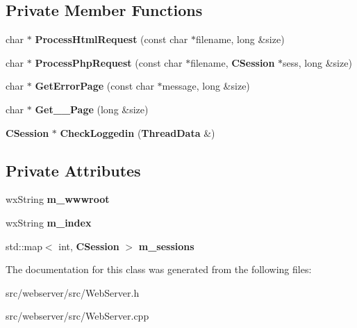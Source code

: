 \subsection*{Private Member Functions}
\begin{DoxyCompactItemize}
\item 
char $\ast$ {\bfseries ProcessHtmlRequest} (const char $\ast$filename, long \&size)\label{classCScriptWebServer_aca95abd93ae76d9c05e647e16886c0fb}

\item 
char $\ast$ {\bfseries ProcessPhpRequest} (const char $\ast$filename, {\bf CSession} $\ast$sess, long \&size)\label{classCScriptWebServer_a1b96b9caa1d2e296c8d6edcaacdf1869}

\item 
char $\ast$ {\bfseries GetErrorPage} (const char $\ast$message, long \&size)\label{classCScriptWebServer_a402a64475860a63434695e8941f8bd03}

\item 
char $\ast$ {\bfseries Get\_\_\-Page} (long \&size)\label{classCScriptWebServer_aeee089dee60950ab3a2959d228c513de}

\item 
{\bf CSession} $\ast$ {\bfseries CheckLoggedin} ({\bf ThreadData} \&)\label{classCScriptWebServer_abdf21bb79cecd59fdc5b297ab3b3c852}

\end{DoxyCompactItemize}
\subsection*{Private Attributes}
\begin{DoxyCompactItemize}
\item 
wxString {\bfseries m\_\-wwwroot}\label{classCScriptWebServer_a41ca3e2bed6746598de192f58cfb5bb8}

\item 
wxString {\bfseries m\_\-index}\label{classCScriptWebServer_ac322f334f96896a152176e54dfbe7242}

\item 
std::map$<$ int, {\bf CSession} $>$ {\bfseries m\_\-sessions}\label{classCScriptWebServer_a3d849089f72663935f2768f774c5bf28}

\end{DoxyCompactItemize}


The documentation for this class was generated from the following files:\begin{DoxyCompactItemize}
\item 
src/webserver/src/WebServer.h\item 
src/webserver/src/WebServer.cpp\end{DoxyCompactItemize}
